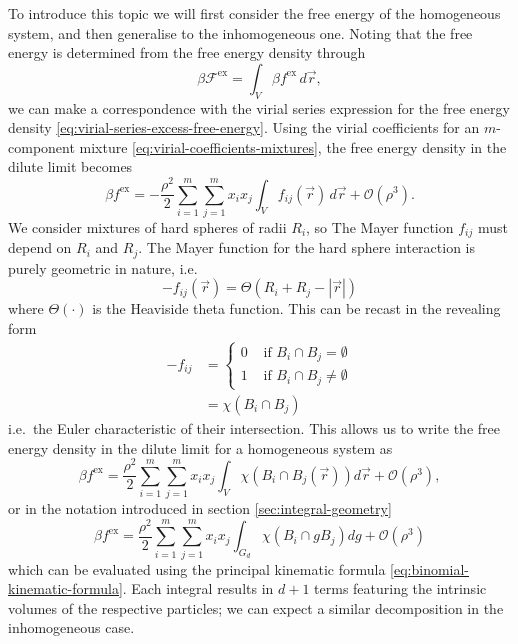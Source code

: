 To introduce this topic we will first consider the free energy of the homogeneous system, and then generalise to the inhomogeneous one.
Noting that the free energy is determined from the free energy density through
\begin{equation*}
  \beta \mathcal{F}^\mathrm{ex} = \int_V \beta f^\mathrm{ex} \, d\vec{r},
\end{equation*}
we can make a correspondence with the virial series expression for the free energy density \eqref{eq:virial-series-excess-free-energy}.
Using the virial coefficients for an $m$-component mixture \eqref{eq:virial-coefficients-mixtures}, the free energy density in the dilute limit becomes
\begin{equation*}
  \beta f^\mathrm{ex}
  =
  - \frac{\rho^2}{2}
  \sum_{i = 1}^m \sum_{j = 1}^m x_i x_j \int_V
  f_{ij}(\vec{r})
  \, d\vec{r}
  + \mathcal{O}(\rho^3).
\end{equation*}
We consider mixtures of hard spheres of radii $R_i$, so The Mayer function $f_{ij}$ must depend on $R_i$ and $R_j$.
The Mayer function for the hard sphere interaction is purely geometric in nature, i.e.\
\begin{equation*}
  -f_{ij}(\vec{r})
  =
  \Theta(R_i + R_j - |\vec{r}|)
\end{equation*}
where $\Theta(\cdot)$ is the Heaviside theta function.
This can be recast in the revealing form
\begin{equation*}\label{eq:hard-mayer-f}
  \begin{split}
    -f_{ij}
    &=
    \begin{cases}
      0 & \textrm{ if } B_i \cap B_j = \emptyset \\
      1 & \textrm{ if } B_i \cap B_j \ne \emptyset
    \end{cases}
    \\ &=
    \chi(B_i \cap B_j)
  \end{split}
\end{equation*}
i.e.\ the Euler characteristic of their intersection.
This allows us to write the free energy density in the dilute limit for a homogeneous system as
\begin{equation*}
  \beta f^\mathrm{ex}
  =
  \frac{\rho^2}{2}
  \sum_{i=1}^m \sum_{j=1}^m
  x_i x_j
  \int_V \chi(B_i \cap B_j(\vec{r})) d\vec{r}
  + \mathcal{O}(\rho^3),
\end{equation*}
or in the notation introduced in section \ref{sec:integral-geometry}
\begin{equation*}
  \beta f^\mathrm{ex}
  =
  \frac{\rho^2}{2}
  \sum_{i=1}^m \sum_{j=1}^m
  x_i x_j
  \int_{G_d} \chi(B_i \cap g B_j) dg
  + \mathcal{O}(\rho^3)
\end{equation*}
which can be evaluated using the principal kinematic formula \eqref{eq:binomial-kinematic-formula}.
Each integral results in $d+1$ terms featuring the intrinsic volumes of the respective particles; we can expect a similar decomposition in the inhomogeneous case.

